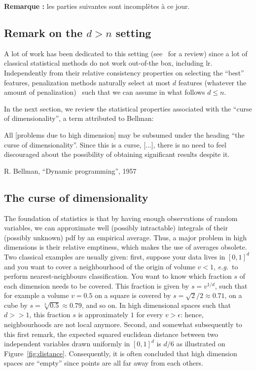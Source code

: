 \textbf{Remarque :} les parties suivantes sont incomplètes à ce jour.

\subsection{Remark on the $d > n$ setting}

A lot of work has been dedicated to this setting (see~\cite{buhlmann2011statistics} for a review) since a lot of classical statistical methods do not work out-of-the box, including \gls{lr}. Independently from their relative consistency properties on selecting the ``best'' features, penalization methods naturally select at most $d$ features (whatever the amount of penalization)~\cite{zhu2004classification} such that we can assume in what follows $d \leq n$.

\setlength{\epigraphwidth}{0.8\textwidth}

In the next section, we review the statistical properties associated with the ``curse of dimensionality'', a term attributed to Bellman:
\epigraph{All [problems due to high dimension] may be subsumed under the heading “the curse of dimensionality”. Since this is a curse, [...], there is no need to feel discouraged about the possibility of obtaining significant results despite it.}{R. Bellman, ``Dynamic programming'', 1957}

\subsection{The curse of dimensionality}

The foundation of statistics is that by having enough observations of random variables, we can approximate well (possibly intractable) integrals of their (possibly unknown) \gls{pdf} by an empirical average. Thus, a major problem in high dimensions is their relative emptiness, which makes the use of averages obsolete. Two classical examples are usually given: first, suppose your data lives in $[0,1]^d$ and you want to cover a neighbourhood of the origin of volume $v < 1$, \textit{e.g.}\ to perform nearest-neighbours classification. You want to know which fraction $s$ of each dimension needs to be covered. This fraction is given by $s = v^{1/d}$, such that for example a volume $v=0.5$ on a square is covered by $s = \sqrt{2}/2 \approx 0.71$, on a cube by $s = \sqrt[3]{0.5} \approx 0.79$, and so on. In high dimensional spaces such that $d>>1$, this fraction $s$ is approximately $1$ for every $v > \epsilon$: hence, neighbourhoods are not local anymore. Second, and somewhat subsequently to this first remark, the expected squared euclidean distance between two independent variables drawn uniformly in $[0,1]^d$ is $d/6$ as illustrated on Figure~\ref{fig:distance}. Consequently, it is often concluded that high dimension spaces are ``empty'' since points are all far away from each others.

